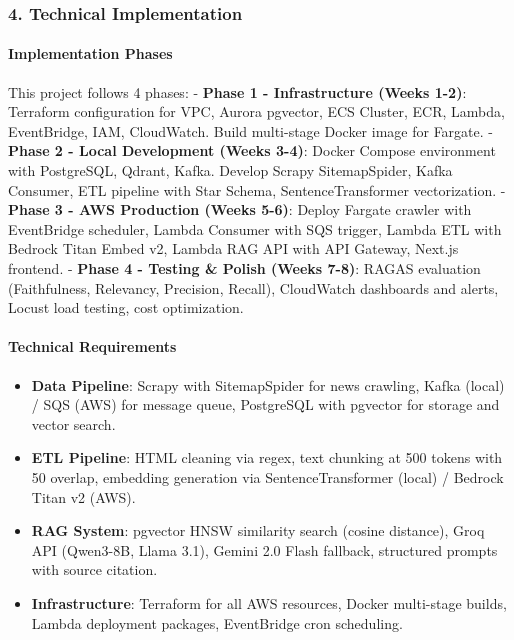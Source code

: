 \hypertarget{technical-implementation}{%
\subsubsection{4. Technical
Implementation}}

\hypertarget{implementation-phases}{%
\paragraph{Implementation Phases}}

This project follows 4 phases: - \textbf{Phase 1 - Infrastructure (Weeks
1-2)}: Terraform configuration for VPC, Aurora pgvector, ECS Cluster,
ECR, Lambda, EventBridge, IAM, CloudWatch. Build multi-stage Docker
image for Fargate. - \textbf{Phase 2 - Local Development (Weeks 3-4)}:
Docker Compose environment with PostgreSQL, Qdrant, Kafka. Develop
Scrapy SitemapSpider, Kafka Consumer, ETL pipeline with Star Schema,
SentenceTransformer vectorization. - \textbf{Phase 3 - AWS Production
(Weeks 5-6)}: Deploy Fargate crawler with EventBridge scheduler, Lambda
Consumer with SQS trigger, Lambda ETL with Bedrock Titan Embed v2,
Lambda RAG API with API Gateway, Next.js frontend. - \textbf{Phase 4 -
Testing \& Polish (Weeks 7-8)}: RAGAS evaluation (Faithfulness,
Relevancy, Precision, Recall), CloudWatch dashboards and alerts, Locust
load testing, cost optimization.

\hypertarget{technical-requirements}{%
\paragraph{Technical Requirements}}

\begin{itemize}
\tightlist
\item
  \textbf{Data Pipeline}: Scrapy with SitemapSpider for news crawling,
  Kafka (local) / SQS (AWS) for message queue, PostgreSQL with pgvector
  for storage and vector search.
\item
  \textbf{ETL Pipeline}: HTML cleaning via regex, text chunking at 500
  tokens with 50 overlap, embedding generation via SentenceTransformer
  (local) / Bedrock Titan v2 (AWS).
\item
  \textbf{RAG System}: pgvector HNSW similarity search (cosine
  distance), Groq API (Qwen3-8B, Llama 3.1), Gemini 2.0 Flash fallback,
  structured prompts with source citation.
\item
  \textbf{Infrastructure}: Terraform for all AWS resources, Docker
  multi-stage builds, Lambda deployment packages, EventBridge cron
  scheduling.
\end{itemize}

